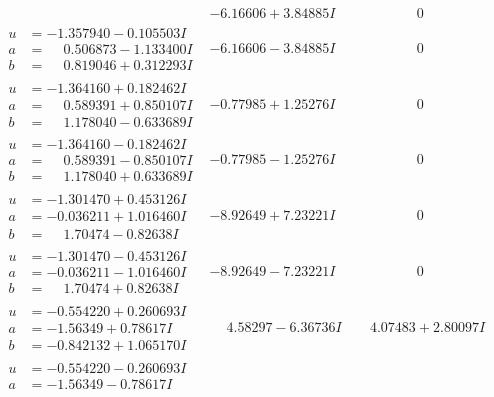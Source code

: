 \documentclass[1p]{elsarticle_modified}
\theoremstyle{definition}
\begin{document}
$$\begin{array}{c|c|c}
 & -6.16606 + 3.84885 I & \phantom{-0.000000 } 0 \\ \hline\begin{aligned}
u &= -1.357940 - 0.105503 I \\
a &= \phantom{-}0.506873 - 1.133400 I \\
b &= \phantom{-}0.819046 + 0.312293 I\end{aligned}
 & -6.16606 - 3.84885 I & \phantom{-0.000000 } 0 \\ \hline\begin{aligned}
u &= -1.364160 + 0.182462 I \\
a &= \phantom{-}0.589391 + 0.850107 I \\
b &= \phantom{-}1.178040 - 0.633689 I\end{aligned}
 & -0.77985 + 1.25276 I & \phantom{-0.000000 } 0 \\ \hline\begin{aligned}
u &= -1.364160 - 0.182462 I \\
a &= \phantom{-}0.589391 - 0.850107 I \\
b &= \phantom{-}1.178040 + 0.633689 I\end{aligned}
 & -0.77985 - 1.25276 I & \phantom{-0.000000 } 0 \\ \hline\begin{aligned}
u &= -1.301470 + 0.453126 I \\
a &= -0.036211 + 1.016460 I \\
b &= \phantom{-}1.70474 - 0.82638 I\end{aligned}
 & -8.92649 + 7.23221 I & \phantom{-0.000000 } 0 \\ \hline\begin{aligned}
u &= -1.301470 - 0.453126 I \\
a &= -0.036211 - 1.016460 I \\
b &= \phantom{-}1.70474 + 0.82638 I\end{aligned}
 & -8.92649 - 7.23221 I & \phantom{-0.000000 } 0 \\ \hline\begin{aligned}
u &= -0.554220 + 0.260693 I \\
a &= -1.56349 + 0.78617 I \\
b &= -0.842132 + 1.065170 I\end{aligned}
 & \phantom{-}4.58297 - 6.36736 I & \phantom{-}4.07483 + 2.80097 I \\ \hline\begin{aligned}
u &= -0.554220 - 0.260693 I \\
a &= -1.56349 - 0.78617 I \\

\end{aligned}
\end{array}$$
\end{document}
